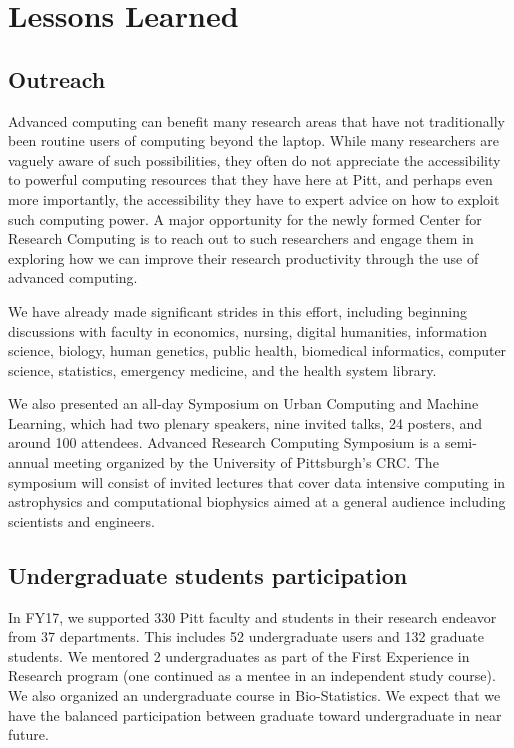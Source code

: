 \documentclass[conference]{IEEEtran}
\begin{document}
\section{Lessons Learned}

\subsection*{Outreach}
Advanced computing can benefit many research areas that have not traditionally been routine users of computing beyond the laptop.  While many researchers are vaguely aware of such possibilities, they often do not appreciate the accessibility to powerful computing resources that they have here at Pitt, and perhaps even more importantly, the accessibility they have to expert advice on how to exploit such computing power. A major opportunity for the newly formed Center for Research Computing is to reach out to such researchers and engage them in exploring how we can improve their research productivity through the use of advanced computing.

We have already made significant strides in this effort, including beginning discussions with faculty in economics, nursing, digital humanities, information science, biology, human genetics, public health, biomedical informatics, computer science, statistics, emergency medicine, and the health system library.

We also presented an all-day Symposium on Urban Computing and Machine Learning, which had two plenary speakers, nine invited talks, 24 posters, and around 100 attendees. Advanced Research Computing Symposium is a semi-annual meeting organized by the University of Pittsburgh's CRC. The symposium will consist of invited lectures that cover data intensive computing in astrophysics and computational biophysics aimed at a general audience including scientists and engineers.




\subsection*{Undergraduate students participation}
In FY17, we supported 330 Pitt faculty and students in their research endeavor from 37 departments. This includes 52 undergraduate users and 132 graduate students. We mentored 2 undergraduates as part of the First Experience in Research program (one continued as a mentee in an independent study course). We also organized an undergraduate course in Bio-Statistics. We expect that we have the balanced participation between graduate toward undergraduate in near future.  
\end{document}
